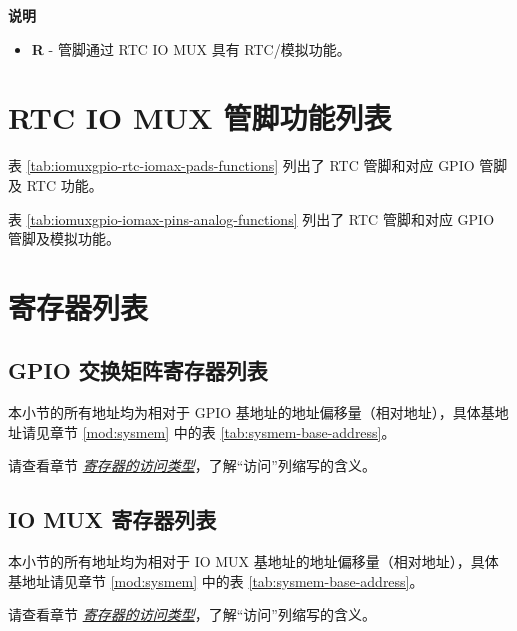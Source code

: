 \documentclass[main\_\_CN.tex]{subfiles}
\begin{document}
\textbf{说明}

\begin{itemize}
\item \textbf{R} - 管脚通过 RTC IO MUX 具有 RTC/模拟功能。
\end{itemize}


\section{RTC IO MUX 管脚功能列表}
\label{sec:rtcmux_pins}

表 \ref{tab:iomuxgpio-rtc-iomax-pads-functions} 列出了 RTC 管脚和对应 GPIO 管脚及 RTC 功能。




表 \ref{tab:iomuxgpio-iomax-pins-analog-functions} 列出了 RTC 管脚和对应 GPIO 管脚及模拟功能。




\hypertarget{iomuxgpio-reg-summ}{}
\section{寄存器列表}
\label{sec:iomuxgpio-reg-summ}


\subsection{GPIO 交换矩阵寄存器列表}
本小节的所有地址均为相对于 GPIO 基地址的地址偏移量（相对地址），具体基地址请见章节 \ref{mod:sysmem} \textit{} 中的表 \ref{tab:sysmem-base-address}。

请查看章节 \hyperref[glossary-access-types]{\textit{寄存器的访问类型}}，了解“访问”列缩写的含义。



\subsection{IO MUX 寄存器列表}
本小节的所有地址均为相对于 IO MUX 基地址的地址偏移量（相对地址），具体基地址请见章节 \ref{mod:sysmem} \textit{} 中的表 \ref{tab:sysmem-base-address}。

请查看章节 \hyperref[glossary-access-types]{\textit{寄存器的访问类型}}，了解“访问”列缩写的含义。


\end{document}

